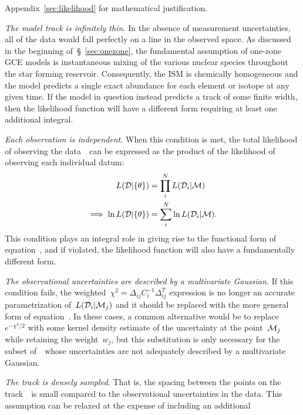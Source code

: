 \documentclass[foo.tex]{subfiles}
\begin{document}
Appendix~\ref{sec:likelihood} for mathematical justification.
\par
\textit{The model track is infinitely thin.}
In the absence of measurement uncertainties, all of the data would fall
perfectly on a line in the observed space.
As discussed in the beginning of~\S~\ref{sec:onezone}, the fundamental
assumption of one-zone GCE models is instantaneous mixing of the various
nuclear species throughout the star forming reservoir.
Consequently, the ISM is chemically homogeneous and the model predicts a single
exact abundance for each element or isotope at any given time.
If the model in question instead predicts a track of some finite width, then
the likelihood function will have a different form requiring at least one
additional integral.
\par
\textit{Each observation is independent.}
When this condition is met, the total likelihood of observing the
data~~can be expressed as the product of the likelihood of observing
each individual datum:
\begin{subequations}\begin{align}
L(\mathcal{D} | \{\theta\}) &= \prod_i^N L(\mathcal{D}_i | \mathcal{M})
\\
\implies \ln L(\mathcal{D} | \{\theta\}) &= \sum_i^N \ln
L(\mathcal{D}_i | \mathcal{M}).
\end{align}\end{subequations}
This condition plays an integral role in giving rise to the functional form of
equation~, and if violated, the likelihood function will
also have a fundamentally different form.
\par
\textit{The observational uncertainties are described by a multivariate
Gaussian.}
If this condition fails, the weighted~$\chi^2 = \Delta_{ij}C_i^{-1}\Delta_{ij}^T$
expression is no longer an accurate parametrization of~$L(\mathcal{D}_i |
\mathcal{M}_j)$ and it should be replaced with the more general form of
equation~.
In these cases, a common alternative would be to replace~$e^{-\chi^2 / 2}$ with
some kernel density estimate of the uncertainty at the point~$\mathcal{M}_j$
while retaining the weight~$w_j$, but this substitution is only necessary for
the subset of~~whose uncertainties are not adequately described by a
multivariate Gaussian.
\par
\textit{The track is densely sampled.}
That is, the spacing between the points on the track~~is small
compared to the observational uncertainties in the data.
This assumption can be relaxed at the expense of including an additional
\end{document}
